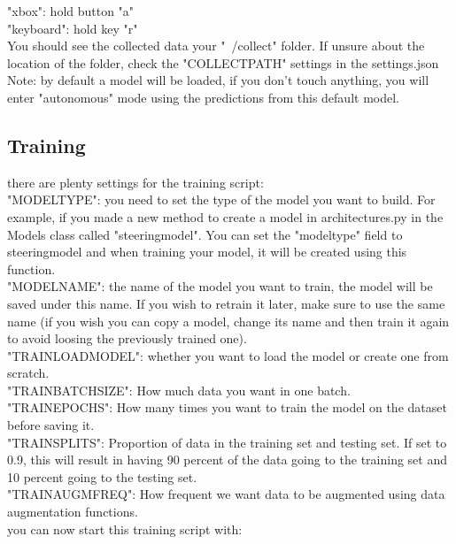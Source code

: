 \documentclass[12pt]{article}
\begin{document}
"xbox": hold button "a"\\
    "keyboard": hold key "r"\\
You should see the collected data your "~/collect" folder. If unsure about the location of the folder, check the "COLLECT\textunderscore PATH" settings in the settings.json\\

Note: by default a model will be loaded, if you don't touch anything, you will enter "autonomous" mode using the predictions from this default model.\\


\subsection{Training}
there are plenty settings for the training script:\\
"MODEL\textunderscore TYPE": you need to set the type of the model you want to build. For example, if you made a new method to create a model in architectures.py in the Models class called "steering\textunderscore model". You can set the "model\textunderscore type" field to steering\textunderscore model and when training your model, it will be created using this function.\\
"MODEL\textunderscore NAME": the name of the model you want to train, the model will be saved under this name. If you wish to retrain it later, make sure to use the same name (if you wish you can copy a model, change its name and then train it again to avoid loosing the previously trained one).\\
"TRAIN\textunderscore LOAD\textunderscore MODEL": whether you want to load the model or create one from scratch.\\
"TRAIN\textunderscore BATCH\textunderscore SIZE": How much data you want in one batch.\\
"TRAIN\textunderscore EPOCHS": How many times you want to train the model on the dataset before saving it.\\
"TRAIN\textunderscore SPLITS": Proportion of data in the training set and testing set. If set to 0.9, this will result in having 90 percent of the data going to the training set and 10 percent going to the testing set.\\
"TRAIN\textunderscore AUGM\textunderscore FREQ": How frequent we want data to be augmented using data augmentation functions.\\


you can now start this training script with:\\
\noindent{}\\
\end{document}
